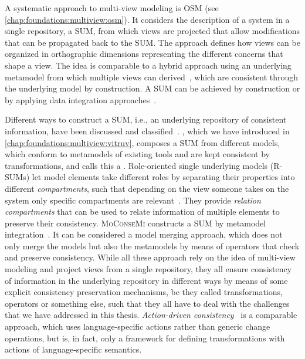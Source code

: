 A systematic approach to multi-view modeling is \gls{OSM} (see \autoref{chap:foundations:multiview:osm}).
It considers the description of a system in a single repository, a \gls{SUM}, from which views are projected that allow modifications that can be propagated back to the \gls{SUM}.
The approach defines how views can be organized in orthographic dimensions representing the different concerns that shape a view.
The idea is comparable to a hybrid approach using an underlying metamodel from which multiple views can derived~\cite{cicchetti2012hybridMultiView-EASST}, which are consistent through the underlying model by construction.
A \gls{SUM} can be achieved by construction or by applying data integration approaches~\cite{angel2018integration-CLSS}.

Different ways to construct a \gls{SUM}, i.e., an underlying repository of consistent information, have been discussed and classified~.
\vitruv, which we have introduced in \autoref{chap:foundations:multiview:vitruv}, composes a \gls{SUM} from different models, which conform to metamodels of existing tools and are kept consistent by transformations, and calls this a \vsum.
Role-oriented single underlying models (R-SUMs) let model elements take different roles by separating their properties into different \emph{compartments}, such that depending on the view someone takes on the system only specific compartments are relevant~\cite{werner2018rsum-SEAA, werner2018rsum-MRT}.
They provide \emph{relation compartments} that can be used to relate information of multiple elements to preserve their consistency.
\textsc{MoConseMi} constructs a \gls{SUM} by metamodel integration~\cite{meier2019MoConseMi-Models}.
It can be considered a model merging approach, which does not only merge the models but also the metamodels by means of operators that check and preserve consistency.
While all these approach rely on the idea of multi-view modeling and project views from a single repository, they all ensure consistency of information in the underlying repository in different ways by means of some explicit consistency preservation mechanisms, be they called transformations, operators or something else, such that they all have to deal with the challenges that we have addressed in this thesis.
\emph{Action-driven consistency}~\cite{ali2020ActionDrivenConsistency-SAM} is a comparable approach, which uses language-specific actions rather than generic change operations, but is, in fact, only a framework for defining transformations with actions of language-specific semantics.

